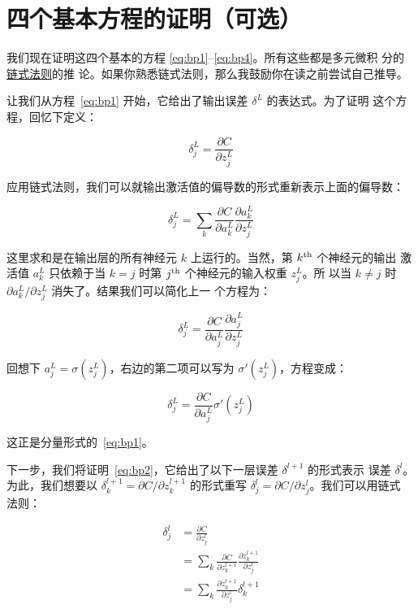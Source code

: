 \section{四个基本方程的证明（可选）}
\label{sec:proof_of_the_four_fundamental_equations}

我们现在证明这四个基本的方程 \eqref{eq:bp1}--\eqref{eq:bp4}。所有这些都是多元微积
分的\href{https://en.wikipedia.org/wiki/Chain_rule}{链式法则}的推
论。如果你熟悉链式法则，那么我鼓励你在读之前尝试自己推导。

让我们从方程~\eqref{eq:bp1} 开始，它给出了输出误差 $\delta^L$ 的表达式。为了证明
这个方程，回忆下定义：

\begin{equation}
  \delta^L_j = \frac{\partial C}{\partial z^L_j}
\label{eq:36}\tag{36}
\end{equation}

应用链式法则，我们可以就输出激活值的偏导数的形式重新表示上面的偏导数：

\begin{equation}
  \delta^L_j = \sum_k \frac{\partial C}{\partial a^L_k} \frac{\partial a^L_k}{\partial z^L_j}
\label{eq:37}\tag{37}
\end{equation}

这里求和是在输出层的所有神经元 $k$ 上运行的。当然，第 $k^{\rm th}$ 个神经元的输出
激活值 $a^L_k$ 只依赖于当 $k=j$ 时第 $j^{\rm th}$ 个神经元的输入权重 $z^L_j$。所
以当 $k \neq j$ 时 $\partial a^L_k / \partial z^L_j$ 消失了。结果我们可以简化上一
个方程为：

\begin{equation}
  \delta^L_j = \frac{\partial C}{\partial a^L_j} \frac{\partial a^L_j}{\partial z^L_j}
\label{eq:38}\tag{38}
\end{equation}

回想下 $a^L_j = \sigma(z^L_j)$，右边的第二项可以写为 $\sigma'(z^L_j)$，方程变成：

\begin{equation}
  \delta^L_j = \frac{\partial C}{\partial a^L_j} \sigma'(z^L_j)
\label{eq:39}\tag{39}
\end{equation}

这正是分量形式的~\eqref{eq:bp1}。

下一步，我们将证明~\eqref{eq:bp2}，它给出了以下一层误差 $\delta^{l+1}$ 的形式表示
误差 $\delta^l$。为此，我们想要以 $\delta^{l+1}_k = \partial C / \partial
z^{l+1}_k$ 的形式重写 $\delta^l_j = \partial C / \partial z^l_j$。我们可以用链式
法则：

\begin{align}
  \delta^l_j &= \frac{\partial C}{\partial z^l_j} \label{eq:40}\tag{40}\\
             &= \sum_k \frac{\partial C}{\partial z^{l+1}_k} \frac{\partial z^{l+1}_k}{\partial z^l_j} \label{eq:41}\tag{41}\\ 
             &= \sum_k \frac{\partial z^{l+1}_k}{\partial z^l_j} \delta^{l+1}_k \label{eq:42}\tag{42}
\end{align}

